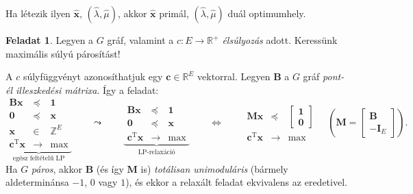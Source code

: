 \documentclass[DIV=15,appendixprefix]{scrreprt}
\theoremstyle{definition}
\newtheorem*{feladat}{Feladat}
\theoremstyle{remark}
\DeclareMathOperator{\T}{T}
\begin{document}
Ha létezik ilyen $ \hat{ \mathbf{ x } } $, $ \left( \hat{ \lambda } ,{} \hat{ \mu } \right) $, akkor $ \hat{ \mathbf{ x } } $ primál, $ \left( \hat{ \lambda } ,{} \hat{ \mu } \right) $ duál optimumhely.
%
\begin{feladat}
	Legyen a $ G $ gráf, valamint a $ c \colon E \rightarrow \mathbb{ R }^{ + } $ \emph{élsúlyozás}
	adott. Keressünk maximális súlyú párosítást!
\end{feladat}
A $ c $ súlyfüggvényt azonosíthatjuk egy $ \mathbf{ c } \in \mathbb{ R }^{ E } $ vektorral. Legyen
$ \mathbf{ B } $ a $ G $ gráf \emph{pont-él illeszkedési mátrixa}. Így a feladat:
\begin{equation*}
	\underbrace{\begin{array}{rcl}
		\mathbf{ B } \mathbf{ x }			&	\preceq	&	\mathbf{ 1 }\\
		\mathbf{ 0 }						&	\preceq	&	\mathbf{ x }\\
		\mathbf{ x }						&	\in		&	\mathbb{ Z }^{ E }\\
		\hline
		\mathbf{ c }^{ \T } \mathbf{ x }	&	\rightarrow	&	\max
	\end{array}}_{\text{egész feltételű LP}} \qquad \leadsto \qquad \underbrace{\begin{array}{rcl}
		\mathbf{ B } \mathbf{ x }			&	\preceq	&	\mathbf{ 1 }\\
		\mathbf{ 0 }						&	\preceq	&	\mathbf{ x }\\
		\hline
		\mathbf{ c }^{ \T } \mathbf{ x }	&	\rightarrow	&	\max
	\end{array}}_{\text{LP-relaxáció}} \qquad \Leftrightarrow \qquad \begin{array}{rcl}
		\mathbf{ M } \mathbf{ x }			&	\preceq	&	\begin{bmatrix}
				\mathbf{ 1 }\\
				\mathbf{ 0 }
			\end{bmatrix}\\
		\hline
		\mathbf{ c }^{ \T } \mathbf{ x }	&	\rightarrow	&	\max
	\end{array} \quad \left( \mathbf{ M } = \begin{bmatrix}
		\mathbf{ B }\\
		- \mathbf{ I }_{ E }
	\end{bmatrix} \right) .
\end{equation*}
Ha $ G $ \emph{páros}, akkor $ \mathbf{ B } $ (és így $ \mathbf{ M } $ is) \emph{totálisan
unimoduláris} (bármely aldeterminánsa $ - 1 $, $ 0 $ vagy $ 1 $), és ekkor a relaxált feladat
ekvivalens az eredetivel.
\end{document}
